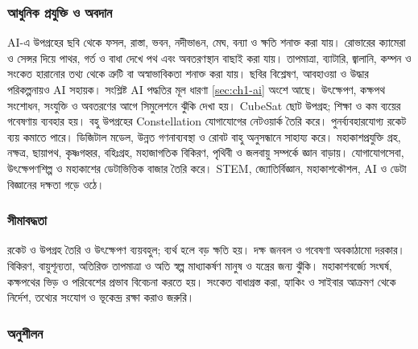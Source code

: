 \subsubsection{আধুনিক প্রযুক্তি ও অবদান}
AI-এ উপগ্রহের ছবি থেকে ফসল, রাস্তা, ভবন, নদীভাঙন, মেঘ, বন্যা ও ক্ষতি শনাক্ত করা যায়। রোভারের ক্যামেরা ও সেন্সর দিয়ে পাথর, গর্ত ও বাধা দেখে পথ এবং অবতরণস্থান বাছাই করা যায়। তাপমাত্রা, ব্যাটারি, জ্বালানি, কম্পন ও সংকেত হারানোর তথ্য থেকে ত্রুটি বা অস্বাভাবিকতা শনাক্ত করা যায়। ছবির বিশ্লেষণ, আবহাওয়া ও উদ্ধার পরিকল্পনায়ও AI সহায়ক। সংশ্লিষ্ট AI পদ্ধতির মূল ধারণা \ref{sec:ch1-ai} অংশে আছে।
উৎক্ষেপণ, কক্ষপথ সংশোধন, সংযুক্তি ও অবতরণের আগে সিমুলেশনে ঝুঁকি দেখা হয়। CubeSat ছোট উপগ্রহ; শিক্ষা ও কম ব্যয়ের গবেষণায় ব্যবহার হয়। বহু উপগ্রহের Constellation যোগাযোগের নেটওয়ার্ক তৈরি করে। পুনর্ব্যবহারযোগ্য রকেট ব্যয় কমাতে পারে। ডিজিটাল মডেল, উন্নত গণনাব্যবস্থা ও রোবট বাহু অনুসন্ধানে সাহায্য করে।
মহাকাশপ্রযুক্তি গ্রহ, নক্ষত্র, ছায়াপথ, কৃষ্ণগহ্বর, বহিঃগ্রহ, মহাজাগতিক বিকিরণ, পৃথিবী ও জলবায়ু সম্পর্কে জ্ঞান বাড়ায়। যোগাযোগসেবা, উৎক্ষেপণশিল্প ও মহাকাশের ডেটাভিত্তিক বাজার তৈরি করে। STEM, জ্যোতির্বিজ্ঞান, মহাকাশকৌশল, AI ও ডেটা বিজ্ঞানের দক্ষতা গড়ে ওঠে।
\subsubsection{সীমাবদ্ধতা}
রকেট ও উপগ্রহ তৈরি ও উৎক্ষেপণ ব্যয়বহুল; ব্যর্থ হলে বড় ক্ষতি হয়। দক্ষ জনবল ও গবেষণা অবকাঠামো দরকার। বিকিরণ, বায়ুশূন্যতা, অতিরিক্ত তাপমাত্রা ও অতি স্বল্প মাধ্যাকর্ষণ মানুষ ও যন্ত্রের জন্য ঝুঁকি। মহাকাশবর্জ্যে সংঘর্ষ, কক্ষপথের ভিড় ও পরিবেশের প্রভাব বিবেচনা করতে হয়। সংকেত বাধাগ্রস্ত করা, হ্যাকিং ও সাইবার আক্রমণ থেকে নির্দেশ, তথ্যের সংযোগ ও ভূকেন্দ্র রক্ষা করাও জরুরি।
\subsubsection{অনুশীলন}

